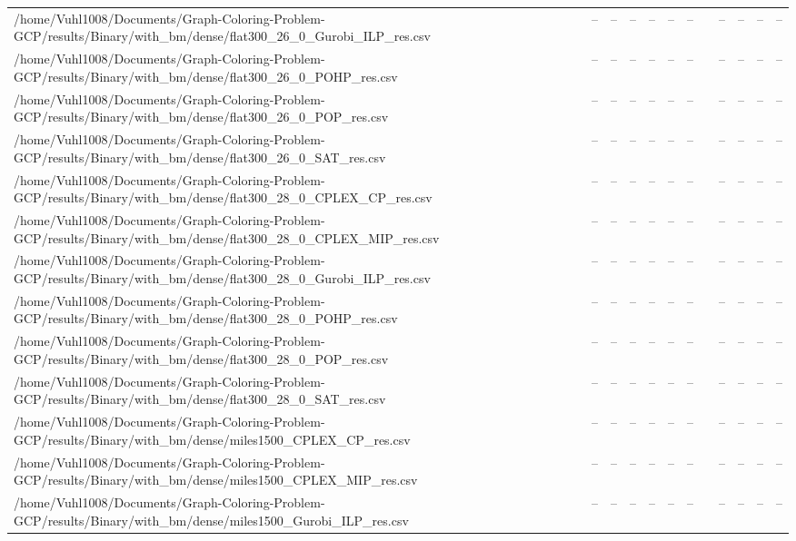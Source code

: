 \begin{table}[htbp]
\begin{tabular}{llllllllllll}
/home/Vuhl1008/Documents/Graph-Coloring-Problem-GCP/results/Binary/with\_bm/dense/flat300\_26\_0\_Gurobi\_ILP\_res.csv & -- & -- & -- & -- & -- & -- & {} & -- & -- & -- & -- \\
/home/Vuhl1008/Documents/Graph-Coloring-Problem-GCP/results/Binary/with\_bm/dense/flat300\_26\_0\_POHP\_res.csv & -- & -- & -- & -- & -- & -- & {} & -- & -- & -- & -- \\
/home/Vuhl1008/Documents/Graph-Coloring-Problem-GCP/results/Binary/with\_bm/dense/flat300\_26\_0\_POP\_res.csv & -- & -- & -- & -- & -- & -- & {} & -- & -- & -- & -- \\
/home/Vuhl1008/Documents/Graph-Coloring-Problem-GCP/results/Binary/with\_bm/dense/flat300\_26\_0\_SAT\_res.csv & -- & -- & -- & -- & -- & -- & {} & -- & -- & -- & -- \\
/home/Vuhl1008/Documents/Graph-Coloring-Problem-GCP/results/Binary/with\_bm/dense/flat300\_28\_0\_CPLEX\_CP\_res.csv & -- & -- & -- & -- & -- & -- & {} & -- & -- & -- & -- \\
/home/Vuhl1008/Documents/Graph-Coloring-Problem-GCP/results/Binary/with\_bm/dense/flat300\_28\_0\_CPLEX\_MIP\_res.csv & -- & -- & -- & -- & -- & -- & {} & -- & -- & -- & -- \\
/home/Vuhl1008/Documents/Graph-Coloring-Problem-GCP/results/Binary/with\_bm/dense/flat300\_28\_0\_Gurobi\_ILP\_res.csv & -- & -- & -- & -- & -- & -- & {} & -- & -- & -- & -- \\
/home/Vuhl1008/Documents/Graph-Coloring-Problem-GCP/results/Binary/with\_bm/dense/flat300\_28\_0\_POHP\_res.csv & -- & -- & -- & -- & -- & -- & {} & -- & -- & -- & -- \\
/home/Vuhl1008/Documents/Graph-Coloring-Problem-GCP/results/Binary/with\_bm/dense/flat300\_28\_0\_POP\_res.csv & -- & -- & -- & -- & -- & -- & {} & -- & -- & -- & -- \\
/home/Vuhl1008/Documents/Graph-Coloring-Problem-GCP/results/Binary/with\_bm/dense/flat300\_28\_0\_SAT\_res.csv & -- & -- & -- & -- & -- & -- & {} & -- & -- & -- & -- \\
/home/Vuhl1008/Documents/Graph-Coloring-Problem-GCP/results/Binary/with\_bm/dense/miles1500\_CPLEX\_CP\_res.csv & -- & -- & -- & -- & -- & -- & {} & -- & -- & -- & -- \\
/home/Vuhl1008/Documents/Graph-Coloring-Problem-GCP/results/Binary/with\_bm/dense/miles1500\_CPLEX\_MIP\_res.csv & -- & -- & -- & -- & -- & -- & {} & -- & -- & -- & -- \\
/home/Vuhl1008/Documents/Graph-Coloring-Problem-GCP/results/Binary/with\_bm/dense/miles1500\_Gurobi\_ILP\_res.csv & -- & -- & -- & -- & -- & -- & {} & -- & -- & -- & -- \\

\end{tabular}
\end{table}
